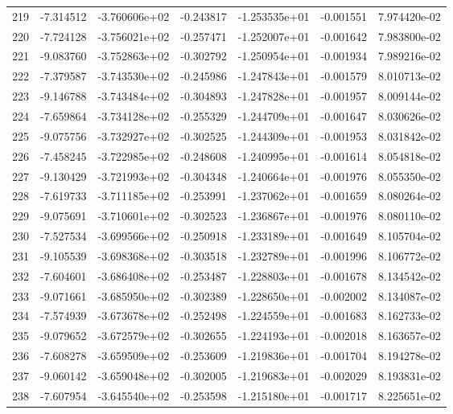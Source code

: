 \begin{tabular}{rrrrrrr}
 219 &  -7.314512 & -3.760606e+02 & -0.243817 & -1.253535e+01 &  -0.001551 &  7.974420e-02 \\
 220 &  -7.724128 & -3.756021e+02 & -0.257471 & -1.252007e+01 &  -0.001642 &  7.983800e-02 \\
 221 &  -9.083760 & -3.752863e+02 & -0.302792 & -1.250954e+01 &  -0.001934 &  7.989216e-02 \\
 222 &  -7.379587 & -3.743530e+02 & -0.245986 & -1.247843e+01 &  -0.001579 &  8.010713e-02 \\
 223 &  -9.146788 & -3.743484e+02 & -0.304893 & -1.247828e+01 &  -0.001957 &  8.009144e-02 \\
 224 &  -7.659864 & -3.734128e+02 & -0.255329 & -1.244709e+01 &  -0.001647 &  8.030626e-02 \\
 225 &  -9.075756 & -3.732927e+02 & -0.302525 & -1.244309e+01 &  -0.001953 &  8.031842e-02 \\
 226 &  -7.458245 & -3.722985e+02 & -0.248608 & -1.240995e+01 &  -0.001614 &  8.054818e-02 \\
 227 &  -9.130429 & -3.721993e+02 & -0.304348 & -1.240664e+01 &  -0.001976 &  8.055350e-02 \\
 228 &  -7.619733 & -3.711185e+02 & -0.253991 & -1.237062e+01 &  -0.001659 &  8.080264e-02 \\
 229 &  -9.075691 & -3.710601e+02 & -0.302523 & -1.236867e+01 &  -0.001976 &  8.080110e-02 \\
 230 &  -7.527534 & -3.699566e+02 & -0.250918 & -1.233189e+01 &  -0.001649 &  8.105704e-02 \\
 231 &  -9.105539 & -3.698368e+02 & -0.303518 & -1.232789e+01 &  -0.001996 &  8.106772e-02 \\
 232 &  -7.604601 & -3.686408e+02 & -0.253487 & -1.228803e+01 &  -0.001678 &  8.134542e-02 \\
 233 &  -9.071661 & -3.685950e+02 & -0.302389 & -1.228650e+01 &  -0.002002 &  8.134087e-02 \\
 234 &  -7.574939 & -3.673678e+02 & -0.252498 & -1.224559e+01 &  -0.001683 &  8.162733e-02 \\
 235 &  -9.079652 & -3.672579e+02 & -0.302655 & -1.224193e+01 &  -0.002018 &  8.163657e-02 \\
 236 &  -7.608278 & -3.659509e+02 & -0.253609 & -1.219836e+01 &  -0.001704 &  8.194278e-02 \\
 237 &  -9.060142 & -3.659048e+02 & -0.302005 & -1.219683e+01 &  -0.002029 &  8.193831e-02 \\
 238 &  -7.607954 & -3.645540e+02 & -0.253598 & -1.215180e+01 &  -0.001717 &  8.225651e-02 \\

\end{tabular}
